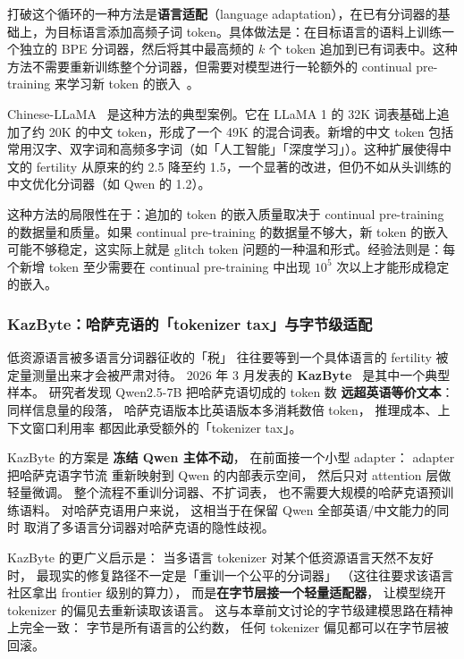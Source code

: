 打破这个循环的一种方法是\textbf{语言适配}（language adaptation），在已有分词器的基础上，为目标语言添加高频子词 token。具体做法是：在目标语言的语料上训练一个独立的 BPE 分词器，然后将其中最高频的 $k$ 个 token 追加到已有词表中。这种方法不需要重新训练整个分词器，但需要对模型进行一轮额外的 continual pre-training 来学习新 token 的嵌入~\cite{cui2024llama}。

Chinese-LLaMA~\cite{cui2024llama} 是这种方法的典型案例。它在 LLaMA 1 的 32K 词表基础上追加了约 20K 的中文 token，形成了一个 49K 的混合词表。新增的中文 token 包括常用汉字、双字词和高频多字词（如「人工智能」「深度学习」）。这种扩展使得中文的 fertility 从原来的约 2.5 降至约 1.5，一个显著的改进，但仍不如从头训练的中文优化分词器（如 Qwen 的 1.2）。

这种方法的局限性在于：追加的 token 的嵌入质量取决于 continual pre-training 的数据量和质量。如果 continual pre-training 的数据量不够大，新 token 的嵌入可能不够稳定，这实际上就是 glitch token 问题的一种温和形式。经验法则是：每个新增 token 至少需要在 continual pre-training 中出现 $10^5$ 次以上才能形成稳定的嵌入。

\subsubsection{KazByte：哈萨克语的「tokenizer tax」与字节级适配}

低资源语言被多语言分词器征收的「税」
往往要等到一个具体语言的 fertility 被定量测量出来才会被严肃对待。
2026 年 3 月发表的 \textbf{KazByte}~\cite{tursynbek2026kazbyte}
是其中一个典型样本。
研究者发现 Qwen2.5-7B
把哈萨克语切成的 token 数
\textbf{远超英语等价文本}：
同样信息量的段落，
哈萨克语版本比英语版本多消耗数倍 token，
推理成本、上下文窗口利用率
都因此承受额外的「tokenizer tax」。

KazByte 的方案是
\textbf{冻结 Qwen 主体不动}，
在前面接一个小型 adapter：
adapter 把哈萨克语字节流
重新映射到 Qwen 的内部表示空间，
然后只对 attention 层做轻量微调。
整个流程不重训分词器、不扩词表，
也不需要大规模的哈萨克语预训练语料。
对哈萨克语用户来说，
这相当于在保留 Qwen 全部英语/中文能力的同时
取消了多语言分词器对哈萨克语的隐性歧视。

KazByte 的更广义启示是：
当多语言 tokenizer 对某个低资源语言天然不友好时，
最现实的修复路径不一定是「重训一个公平的分词器」
（这往往要求该语言社区拿出 frontier 级别的算力），
而是\textbf{在字节层接一个轻量适配器}，
让模型绕开 tokenizer 的偏见去重新读取该语言。
这与本章前文讨论的字节级建模思路在精神上完全一致：
字节是所有语言的公约数，
任何 tokenizer 偏见都可以在字节层被回滚。

